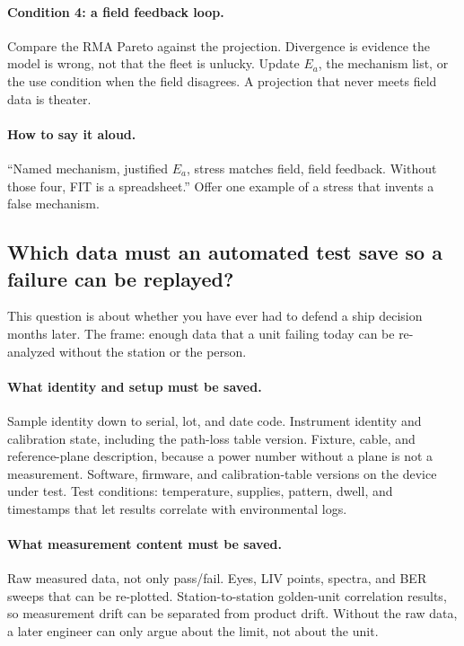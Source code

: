 \paragraph{Condition 4: a field feedback loop.}
Compare the RMA Pareto against the projection. Divergence is
evidence the model is wrong, not that the fleet is unlucky. Update $E_a$, the
mechanism list, or the use condition when the field disagrees. A projection
that never meets field data is theater.

\paragraph{How to say it aloud.}
``Named mechanism, justified $E_a$, stress matches field, field feedback.
Without those four, FIT is a spreadsheet.'' Offer one example of a stress that
invents a false mechanism.

\subsection{Which data must an automated test save so a failure can be
replayed?}
\label{sec:interview-worked-test-data}

This question is about whether you have ever had to defend a ship decision
months later. The frame: enough data that a unit failing today can be re-
analyzed without the station or the person.

\paragraph{What identity and setup must be saved.}
Sample identity down to serial, lot, and date code. Instrument identity and
calibration state, including the path-loss table version. Fixture, cable, and
reference-plane description, because a power number without a plane is not a
measurement. Software, firmware, and calibration-table versions on the device
under test. Test conditions: temperature, supplies, pattern, dwell, and
timestamps that let results correlate with environmental logs.

\paragraph{What measurement content must be saved.}
Raw measured data, not only pass/fail. Eyes, LIV points,
spectra, and BER sweeps that can be re-plotted.
Station-to-station golden-unit correlation results, so measurement drift can
be separated from product drift. Without the raw data, a later engineer can
only argue about the limit, not about the unit.

